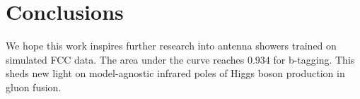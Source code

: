 \section{Conclusions}\label{sec:conclusions}

We hope this work inspires further research into antenna showers trained
on simulated FCC data. The area under the curve reaches 0.934 for
b-tagging. This sheds new light on model-agnostic infrared poles of
Higgs boson production in gluon fusion.

